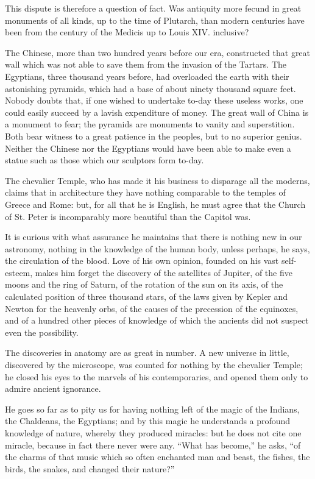 This dispute is therefore a question of fact. Was antiquity more fecund
in great monuments of all kinds, up to the time of Plutarch, than modern
centuries have been from the century of the Medicis up to Louis XIV.
inclusive?

The Chinese, more than two hundred years before our era, constructed
that great wall which was not able to save them from the invasion of the
Tartars. The Egyptians, three thousand years before, had overloaded the
earth with their astonishing pyramids, which had a base of about ninety
thousand square feet. Nobody doubts that, if one wished to undertake
to-day these useless works, one could easily succeed by a lavish
expenditure of money. The great wall of China is a monument to fear; the
pyramids are monuments to vanity and superstition. Both bear witness to
a great patience in the peoples, but to no superior genius. Neither the
Chinese nor the Egyptians would have been able to make even a statue
such as those which our sculptors form to-day.

The chevalier Temple, who has made it his business to disparage all the
moderns, claims that in architecture they have nothing comparable to the
temples of Greece and Rome: but, for all that he is English, he must
agree that the Church of St. Peter is incomparably more beautiful than
the Capitol was.

It is curious with what assurance he maintains that there is nothing new
in our astronomy, nothing in the knowledge of the human body, unless
perhaps, he says, the circulation of the blood. Love of his own opinion,
founded on his vast self-esteem, makes him forget the discovery of the
satellites of Jupiter, of the five moons and the ring of Saturn, of the
rotation of the sun on its axis, of the calculated position of three
thousand stars, of the laws given by Kepler and Newton for the heavenly
orbs, of the causes of the precession of the equinoxes, and of a hundred
other pieces of knowledge of which the ancients did not suspect even the
possibility.

The discoveries in anatomy are as great in number. A new universe in
little, discovered by the microscope, was counted for nothing by the
chevalier Temple; he closed his eyes to the marvels of his
contemporaries, and opened them only to admire ancient ignorance.

He goes so far as to pity us for having nothing left of the magic of the
Indians, the Chaldeans, the Egyptians; and by this magic he understands
a profound knowledge of nature, whereby they produced miracles: but he
does not cite one miracle, because in fact there never were any. \enquote{What
has become,} he asks, \enquote{of the charms of that music which so often
enchanted man and beast, the fishes, the birds, the snakes, and changed
their nature?}

